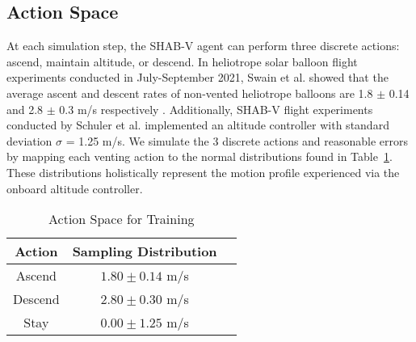  \subsection{Action Space}

At each simulation step, the SHAB-V agent can perform three discrete actions: ascend, maintain altitude, or descend. In heliotrope solar balloon flight experiments conducted in July-September 2021, Swain et al. showed that the average ascent and descent rates of non-vented heliotrope balloons are 1.8 $\pm$ 0.14 and 2.8 $\pm$ 0.3 m/s respectively \cite{swain2024heliotrope}. Additionally, SHAB-V flight experiments conducted by Schuler et al. implemented an altitude controller with standard deviation $\sigma$ = 1.25 m/s. We simulate the 3 discrete actions and reasonable errors by mapping each venting action to the normal distributions found in Table~\ref{tab:actionspace}. These distributions holistically represent the motion profile experienced via the onboard altitude controller.


\begin{table}[h]
\renewcommand{\arraystretch}{1.2}
\caption{Action Space for Training}
\centering
\begin{tabular}{|c|c|c|}
\hline
\bfseries Action & \bfseries Sampling Distribution \\
\hline%
Ascend & $1.80 \pm 0.14$ m/s\\
Descend & $2.80 \pm 0.30$ m/s\\
Stay & $0.00 \pm 1.25$ m/s\\
\hline
\end{tabular}
\label{tab:actionspace}
\end{table}

